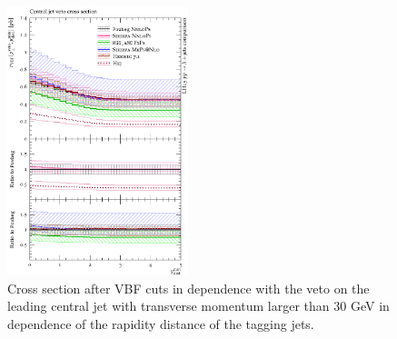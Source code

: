 \begin{figure}[t!]
  \centering
  \includegraphics[width=0.47\textwidth]{figures/hjetscomp_xs_central_jet_veto_VBF.pdf}
  \caption{
    Cross section after VBF cuts in dependence with the veto on the leading 
    central jet with transverse momentum larger than 30 GeV in dependence 
    of the rapidity distance of the tagging jets.
    \label{fig:higgscomp:results:1obs:cjvxsvbf}
  }
\end{figure}

